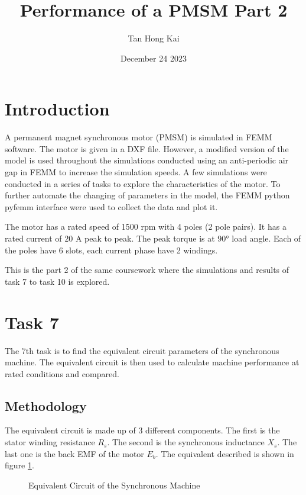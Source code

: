 \documentclass[12pt]{article}
\title{Performance of a PMSM Part 2}
\author{Tan Hong Kai}
\date{December 24 2023}
\begin{document}
\maketitle

\section{Introduction}

A permanent magnet synchronous motor (PMSM) is simulated in FEMM software. The motor is given in a DXF file. However, a modified version of the model is used throughout the simulations conducted using an anti-periodic air gap in FEMM to increase the simulation speeds. A few simulations were conducted in a series of tasks to explore the characteristics of the motor. To further automate the changing of parameters in the model, the FEMM python pyfemm interface were used to collect the data and plot it.

The motor has a rated speed of 1500 rpm with 4 poles (2 pole pairs). It has a rated current of $20$ A peak to peak. The peak torque is at $\ang{90}$ load angle. Each of the poles have 6 slots, each current phase have 2 windings. 

This is the part 2 of the same coursework where the simulations and results of task 7 to task 10 is explored.

\section{Task 7}

The 7th task is to find the equivalent circuit parameters of the synchronous machine. The equivalent circuit is then used to calculate machine performance at rated conditions and compared.

\subsection{Methodology}

The equivalent circuit is made up of 3 different components. The first is the stator winding resistance $R_{s}$. The second is the synchronous inductance $X_{s}$. The last one is the back EMF of the motor $E_{b}$. The equivalent described is shown in figure \ref{fig:eq-circuit-combi}.

\begin{figure}[H]
    \centering
    \caption{Equivalent Circuit of the Synchronous Machine}
    \label{fig:eq-circuit-combi}
\end{figure}
\end{document}

